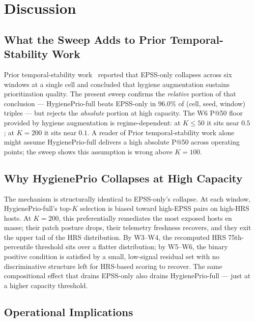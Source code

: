 \section{Discussion}

\subsection{What the Sweep Adds to Prior Temporal-Stability Work}

Prior temporal-stability work~\cite{paper5temporal} reported that EPSS-only collapses across
six windows at a single cell and concluded that hygiene augmentation
sustains prioritization quality. The present sweep confirms the
\textit{relative} portion of that conclusion --- HygienePrio-full beats
EPSS-only in $96.0\%$ of (cell, seed, window) triples --- but rejects
the \textit{absolute} portion at high capacity. The W6 P@50 floor
provided by hygiene augmentation is regime-dependent: at $K \leq 50$
it sits near $0.5$; at $K = 200$ it sits near $0.1$. A reader of
Prior temporal-stability work alone might assume HygienePrio-full delivers a high absolute
P@50 across operating points; the sweep shows this assumption is wrong
above $K = 100$.

\subsection{Why HygienePrio Collapses at High Capacity}

The mechanism is structurally identical to EPSS-only's collapse. At
each window, HygienePrio-full's top-$K$ selection is biased toward
high-EPSS pairs on high-HRS hosts. At $K = 200$, this preferentially
remediates the most exposed hosts en masse; their patch posture drops,
their telemetry freshness recovers, and they exit the
upper tail of the HRS distribution. By W3--W4, the recomputed HRS
75th-percentile threshold sits over a flatter distribution; by W5--W6,
the binary positive condition is satisfied by a small, low-signal
residual set with no discriminative structure left for HRS-based
scoring to recover. The same compositional effect that drains EPSS-only
also drains HygienePrio-full --- just at a higher capacity threshold.

\subsection{Operational Implications}

